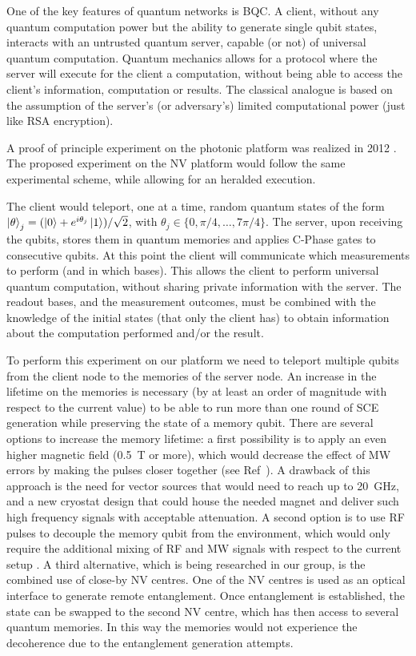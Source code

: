 \documentclass[a4paper]{article}
\begin{document}
One of the key features of quantum networks is \ac{BQC}. A client, without any quantum computation power but the ability to generate single qubit states, interacts with an untrusted quantum server, capable (or not) of universal quantum computation. Quantum mechanics allows for a protocol where the server will execute for the client a computation, without being able to access the client's information, computation or results. The classical analogue is based on the assumption of the server's (or adversary's) limited computational power (just like RSA encryption).

A proof of principle experiment on the photonic platform was realized in 2012 \cite{Barz2012}. The proposed experiment on the \ac{NV} platform would follow the same experimental scheme, while allowing for an heralded execution.

The client would teleport, one at a time, random quantum states of the form $\ket\theta_j = (\ket 0 + e^{i \theta_j}\ket 1)/\sqrt 2$, with $\theta_j \in \lbrace0, \pi/4,\ldots,7\pi/4\rbrace$. The server, upon receiving the qubits, stores them in quantum memories and applies C-Phase gates to consecutive qubits.
At this point the client will communicate which measurements to perform (and in which bases). This allows the client to perform universal quantum computation, without sharing private information with the server. The readout bases, and the measurement outcomes, must be combined with the knowledge of the initial states (that only the client has) to obtain information about the computation performed and/or the result.

To perform this experiment on our platform we need to teleport multiple qubits from the client node to the memories of the server node. An increase in the lifetime on the memories is necessary (by at least an order of magnitude with respect to the current value) to be able to run more than one round of \ac{SCE} generation while preserving the state of a memory qubit. There are several options to increase the memory lifetime: a first possibility is to apply an even higher magnetic field (\SI{0.5}{T} or more), which would decrease the effect of \ac{MW} errors by making the pulses closer together (see Ref~\cite{Kalb2017}). A drawback of this approach is the need for vector sources that would need to reach up to \SI{20}{GHz}, and a new cryostat design that could house the needed magnet and deliver such high frequency signals with acceptable attenuation. A second option is to use \ac{RF} pulses to decouple the memory qubit from the environment, which would only require the additional mixing of \ac{RF} and \ac{MW} signals with respect to the current setup \cite{Bradley2018}. 
A third alternative, which is being researched in our group, is the combined use of close-by \ac{NV} centres. One of the \ac{NV} centres is used as an optical interface to generate remote entanglement. Once entanglement is established, the state can be swapped to the second \ac{NV} centre, which has then access to several quantum memories. In this way the memories would not experience the decoherence due to the entanglement generation attempts.
\end{document}
